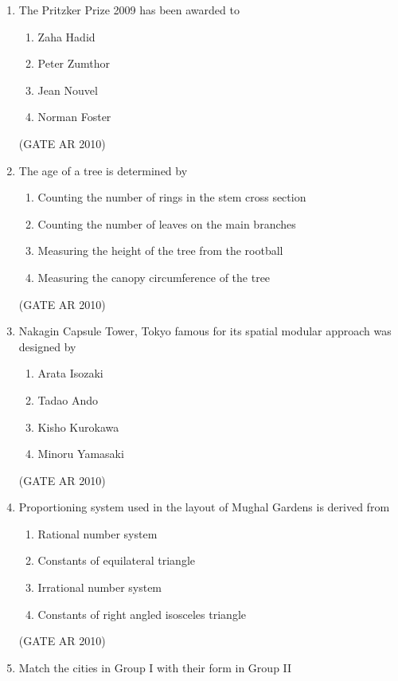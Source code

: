 \documentclass[journal]{IEEEtran}
\begin{document}
\begin{enumerate}
\item The Pritzker Prize 2009 has been awarded to
\begin{multicols}{2}
\begin{enumerate}
\item Zaha Hadid
\item Peter Zumthor
\item Jean Nouvel
\item Norman Foster
\end{enumerate}
\end{multicols}
\hfill (GATE AR 2010)

\item The age of a tree is determined by
\begin{enumerate}
\item Counting the number of rings in the stem cross section
\item Counting the number of leaves on the main branches
\item Measuring the height of the tree from the rootball
\item Measuring the canopy circumference of the tree
\end{enumerate}
\hfill (GATE AR 2010)

\item Nakagin Capsule Tower, Tokyo famous for its spatial modular approach was designed by
\begin{multicols}{2}
\begin{enumerate}
\item Arata Isozaki
\item Tadao Ando
\item Kisho Kurokawa
\item Minoru Yamasaki
\end{enumerate}
\end{multicols}
\hfill (GATE AR 2010)

\item Proportioning system used in the layout of Mughal Gardens is derived from
\begin{enumerate}
\item Rational number system
\item Constants of equilateral triangle
\item Irrational number system
\item Constants of right angled isosceles triangle
\end{enumerate}
\hfill (GATE AR 2010)

\item Match the cities in Group I with their form in Group II


\end{enumerate}
\end{document}
